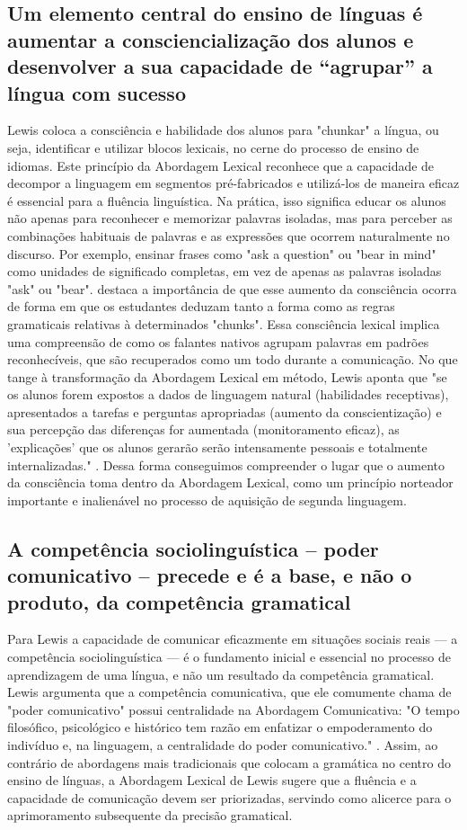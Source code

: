 \subsection{Um elemento central do ensino de línguas é aumentar a consciencialização dos alunos e desenvolver a sua capacidade de “agrupar” a língua com sucesso}

Lewis coloca a consciência e habilidade dos alunos para "chunkar" a língua, ou seja, identificar e utilizar blocos lexicais, no cerne do processo de ensino de idiomas. Este princípio da Abordagem Lexical reconhece que a capacidade de decompor a linguagem em segmentos pré-fabricados e utilizá-los de maneira eficaz é essencial para a fluência linguística. Na prática, isso significa educar os alunos não apenas para reconhecer e memorizar palavras isoladas, mas para perceber as combinações habituais de palavras e as expressões que ocorrem naturalmente no discurso. Por exemplo, ensinar frases como "ask a question" ou "bear in mind" como unidades de significado completas, em vez de apenas as palavras isoladas "ask" ou "bear".  destaca a importância de que esse aumento da consciência ocorra de forma em que os estudantes deduzam tanto a forma como as regras gramaticais relativas à determinados "chunks". Essa consciência lexical implica uma compreensão de como os falantes nativos agrupam palavras em padrões reconhecíveis, que são recuperados como um todo durante a comunicação. No que tange à transformação da Abordagem Lexical em método, Lewis aponta que "se os alunos forem expostos a dados de linguagem natural (habilidades receptivas), apresentados a tarefas e perguntas apropriadas (aumento da conscientização) e sua percepção das diferenças for aumentada (monitoramento eficaz), as 'explicações' que os alunos gerarão serão intensamente pessoais e totalmente internalizadas." \cite[p. 151]{lewis1993}. Dessa forma conseguimos compreender o lugar que o aumento da consciência toma dentro da Abordagem Lexical, como um princípio norteador importante e inalienável no processo de aquisição de segunda linguagem.


\subsection{A competência sociolinguística – poder comunicativo – precede e é a base, e não o produto, da competência gramatical}

Para Lewis a capacidade de comunicar eficazmente em situações sociais reais — a competência sociolinguística — é o fundamento inicial e essencial no processo de aprendizagem de uma língua, e não um resultado da competência gramatical. Lewis argumenta que a competência comunicativa, que ele comumente chama de "poder comunicativo" possui centralidade na Abordagem Comunicativa: "O tempo filosófico, psicológico e histórico tem razão em enfatizar o empoderamento do indivíduo e, na linguagem, a centralidade do poder comunicativo." \cite[p. 74]{lewis1993}. Assim, ao contrário de abordagens mais tradicionais que colocam a gramática no centro do ensino de línguas, a Abordagem Lexical de Lewis sugere que a fluência e a capacidade de comunicação devem ser priorizadas, servindo como alicerce para o aprimoramento subsequente da precisão gramatical.

